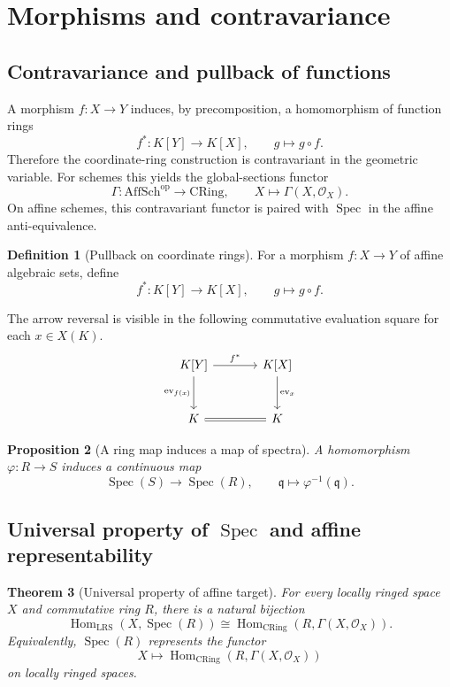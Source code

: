 \documentclass[12pt, a4paper]{article}
\newtheorem{theorem}{Theorem}[section]
\newtheorem{proposition}[theorem]{Proposition}
\theoremstyle{definition}
\newtheorem{definition}[theorem]{Definition}
\DeclareMathOperator{\Spec}{Spec}
\DeclareMathOperator{\Hom}{Hom}
\newcommand{\OO}{\mathcal{O}}
\newcommand{\AffSch}{\mathrm{AffSch}}
\newcommand{\CRing}{\mathrm{CRing}}
\newcommand{\LRS}{\mathrm{LRS}}
\begin{document}
\section{Morphisms and contravariance}

\subsection{Contravariance and pullback of functions}

A morphism $f:X\to Y$ induces, by precomposition, a homomorphism of function rings
\[
f^*:K[Y]\to K[X],\qquad g\mapsto g\circ f.
\]
Therefore the coordinate-ring construction is contravariant in the geometric variable. For schemes this yields the global-sections functor
\[
\Gamma:\AffSch^{\mathrm{op}}\longrightarrow \CRing,
\qquad
X\longmapsto \Gamma(X,\OO_X).
\]
On affine schemes, this contravariant functor is paired with $\Spec$ in the affine anti-equivalence.

\begin{definition}[Pullback on coordinate rings]
For a morphism $f:X\to Y$ of affine algebraic sets, define
\[
f^*:K[Y]\to K[X],\qquad g\mapsto g\circ f.
\]
\end{definition}

The arrow reversal is visible in the following commutative evaluation square for each $x\in X(K)$.
\[
\begin{tikzcd}[column sep=large, row sep=large]
K[Y] \arrow[r, "f^*"] \arrow[d, "\mathrm{ev}_{f(x)}"'] & K[X] \arrow[d, "\mathrm{ev}_x"] \\
K \arrow[r, equal] & K
\end{tikzcd}
\]

\begin{proposition}[A ring map induces a map of spectra]
A homomorphism $\varphi:R\to S$ induces a continuous map
\[
\Spec(S)\to\Spec(R),\qquad \mathfrak q\mapsto \varphi^{-1}(\mathfrak q).
\]
\end{proposition}

\subsection{Universal property of \texorpdfstring{$\Spec$}{Spec} and affine representability}

\begin{theorem}[Universal property of affine target]
For every locally ringed space $X$ and commutative ring $R$, there is a natural bijection
\[
\boxed{\Hom_{\LRS}(X,\Spec(R))\cong \Hom_{\CRing}(R,\Gamma(X,\OO_X)).}
\]
Equivalently, $\Spec(R)$ represents the functor
\[
X\longmapsto \Hom_{\CRing}(R,\Gamma(X,\OO_X))
\]
on locally ringed spaces.
\end{theorem}
\end{document}
